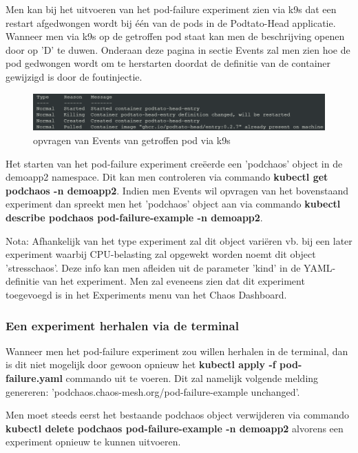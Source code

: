 Men kan bij het uitvoeren van het pod-failure experiment zien via k9s dat een restart afgedwongen wordt bij één van de pods in de Podtato-Head applicatie. Wanneer men via k9s op de getroffen pod staat kan men de beschrijving openen door op 'D' te duwen. Onderaan deze pagina in sectie Events zal men zien hoe de pod gedwongen wordt om te herstarten doordat de definitie van de container gewijzigd is door de foutinjectie.

\begin{figure}[h]
    \centering
    \includegraphics[scale=.7]{img/k9s-pod-described.png}
    \caption{opvragen van Events van getroffen pod via k9s}
\end{figure}

Het starten van het pod-failure experiment creëerde een 'podchaos' object in de demoapp2 namespace. Dit kan men controleren via commando {\bf kubectl get podchaos -n demoapp2}. Indien men Events wil opvragen van het bovenstaand experiment dan spreekt men het 'podchaos' object aan via commando {\bf kubectl describe podchaos pod-failure-example -n demoapp2}.

Nota: Afhankelijk van het type experiment zal dit object variëren vb. bij een later experiment waarbij CPU-belasting zal opgewekt worden noemt dit object 'stresschaos'. Deze info kan men afleiden uit de parameter 'kind' in de YAML-definitie van het experiment. Men zal eveneens zien dat dit experiment toegevoegd is in het Experiments menu van het Chaos Dashboard.

\subsubsection{Een experiment herhalen via de terminal}

Wanneer men het pod-failure experiment zou willen herhalen in de terminal, dan is dit niet mogelijk door gewoon opnieuw het {\bf kubectl apply -f pod-failure.yaml} commando uit te voeren. Dit zal namelijk volgende melding genereren: 'podchaos.chaos-mesh.org/pod-failure-example unchanged'. 

Men moet steeds eerst het bestaande podchaos object verwijderen via commando {\bf kubectl delete podchaos pod-failure-example -n demoapp2} alvorens een experiment opnieuw te kunnen uitvoeren. 

